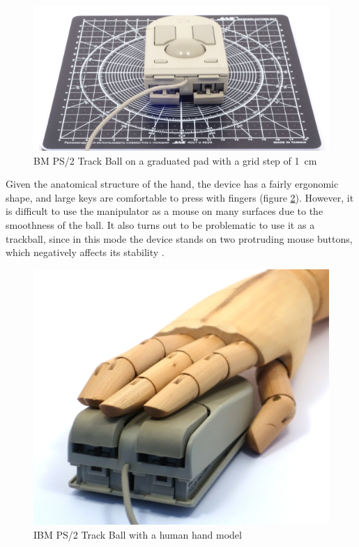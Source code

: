 \documentclass[11pt, a4paper]{article}
\begin{document}
\begin{figure}[h]
    \centering
    \includegraphics[scale=0.56]{1992_ibm_convertible/size_30.jpg}
    \caption{BM PS/2 Track Ball on a graduated pad with a grid step of 1~cm}
    \label{fig:IBMConvertibleSize}
\end{figure}

Given the anatomical structure of the hand, the device has a fairly ergonomic shape, and large keys are comfortable to press with fingers (figure \ref{fig:IBMConvertibleHand}). However, it is difficult to use the manipulator as a mouse on many surfaces due to the smoothness of the ball. It also turns out to be problematic to use it as a trackball, since in this mode the device stands on two protruding mouse buttons, which negatively affects its stability \cite{IBM}.

\begin{figure}[h]
    \centering
    \includegraphics[scale=0.45]{1992_ibm_convertible/hand_60.jpg}
    \caption{IBM PS/2 Track Ball with a human hand model}
    \label{fig:IBMConvertibleHand}
\end{figure}
\end{document}
